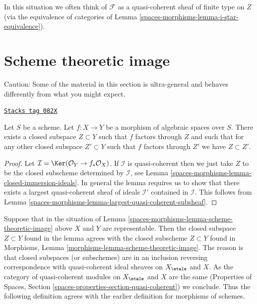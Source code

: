 In this situation we often think of $\mathcal{F}$ as a quasi-coherent
sheaf of finite type on $Z$ (via the equivalence of categories of
Lemma \ref{spaces-morphisms-lemma-i-star-equivalence}).

\section{Scheme theoretic image}
\label{spaces-morphisms-section-scheme-theoretic-image}
Caution: Some of the material in this section is ultra-general and
behaves differently from what you might expect.

\begin{lemma}
\label{spaces-morphisms-lemma-scheme-theoretic-image}
\href{https://stacks.math.columbia.edu/tag/082X}{\texttt{Stacks tag 082X}}


Let $S$ be a scheme. Let $f : X \to Y$ be a morphism of algebraic spaces
over $S$. There exists a closed subspace $Z \subset Y$ such that $f$ factors
through $Z$ and such that for any other closed subspace $Z' \subset Y$
such that $f$ factors through $Z'$ we have $Z \subset Z'$.
\end{lemma}

\begin{proof}
Let $\mathcal{I} = \Ker(\mathcal{O}_Y \to f_*\mathcal{O}_X)$.
If $\mathcal{I}$ is quasi-coherent then we just take $Z$ to be the
closed subscheme determined by $\mathcal{I}$, see
Lemma \ref{spaces-morphisms-lemma-closed-immersion-ideals}.
In general the lemma requires us to show that there exists
a largest quasi-coherent sheaf of ideals $\mathcal{I}'$ contained in
$\mathcal{I}$.
This follows from Lemma \ref{spaces-morphisms-lemma-largest-quasi-coherent-subsheaf}.
\end{proof}

Suppose that in the situation of Lemma \ref{spaces-morphisms-lemma-scheme-theoretic-image}
above $X$ and $Y$ are representable. Then the closed subspace $Z \subset Y$
found in the lemma agrees with the closed subscheme $Z \subset Y$ found in
Morphisms, Lemma \ref{morphisms-lemma-scheme-theoretic-image}.
The reason is that closed subspaces (or subschemes) are in an inclusion
reversing correspondence with quasi-coherent ideal sheaves on
$X_\etale$ and $X$. As the category of quasi-coherent modules
on $X_\etale$ and $X$ are the same
(Properties of Spaces, Section \ref{spaces-properties-section-quasi-coherent})
we conclude. Thus the following definition agrees with the earlier
definition for morphisms of schemes.

